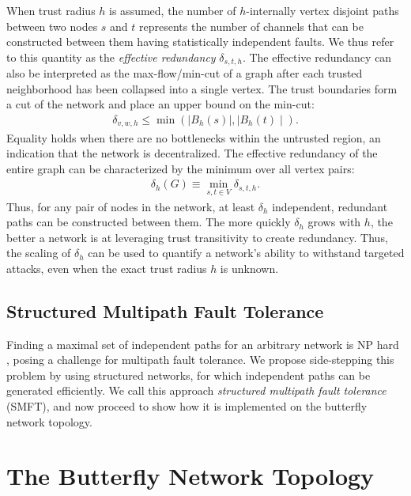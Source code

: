 \documentclass[10pt,letterpaper]{article}
\newcommand{\beq}{\begin{eqnarray}}
\newcommand{\eeq}{\end{eqnarray}}
\begin{document}
When trust radius $h$ is assumed,
the number of $h$-internally vertex disjoint paths between
two nodes $s$ and $t$ represents the number of
channels that can be constructed between them having
statistically independent faults.
We thus refer to this quantity as the 
{\em effective redundancy} $\delta_{s,t,h}$.
The effective redundancy can also be interpreted as the
max-flow/min-cut of a graph after each trusted neighborhood has been
collapsed into a single vertex.
The trust boundaries form a cut of the network and place an upper bound on the
min-cut:
\beq
\delta_{v,w,h} \leq \min\left( \mid B_h(s) \mid, \mid B_h(t) \mid \right).
\eeq
Equality holds when there are no bottlenecks within the untrusted region,
an indication that the network is decentralized.
The effective redundancy of the entire graph can be characterized by the minimum
over all vertex pairs:
\beq
\delta_h(G) \equiv \min_{s,t \in V} \delta_{s,t,h}.
\eeq
Thus, for any pair of nodes in the network, at least $\delta_h$ independent,
redundant paths can be constructed between them.
The more quickly $\delta_h$ grows with $h$,
the better a network is at leveraging trust transitivity to create redundancy.
Thus, the scaling of $\delta_h$ can be used to quantify a network's ability
to withstand targeted attacks,
even when the exact trust radius $h$ is unknown.

\subsection*{Structured Multipath Fault Tolerance}

Finding a maximal set of independent paths for an arbitrary network is NP hard
\cite{reiter_resilient_1998},
posing a challenge for multipath fault tolerance.
We propose side-stepping this problem by using structured networks,
for which independent paths can be generated efficiently.
We call this approach {\em structured multipath fault tolerance} (SMFT),
and now proceed to show how it is implemented on the butterfly
network topology.

\section*{The Butterfly Network Topology}
\label{sec-butterfly}
\end{document}
